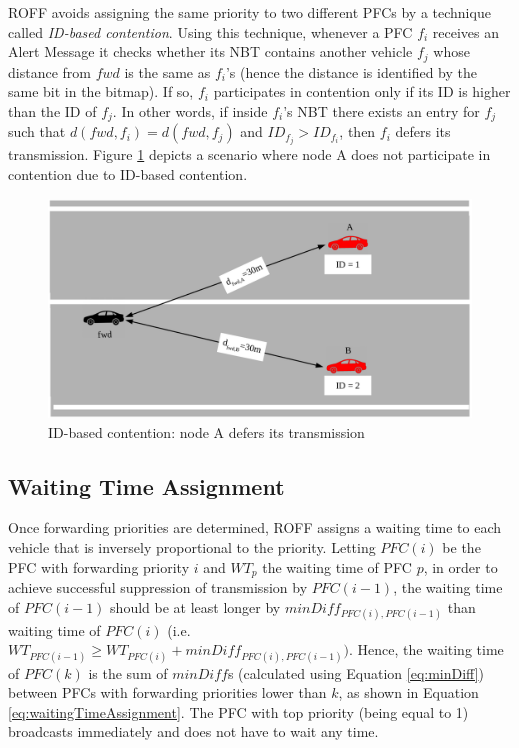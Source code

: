 			
			ROFF avoids assigning the same priority to two different PFCs by a technique called \textit{ID-based contention}. Using this technique, whenever a PFC $f_i$ receives an Alert Message it checks whether its NBT contains another vehicle $f_j$ whose distance from $fwd$ is the same as $f_i$'s (hence the distance is identified by the same bit in the bitmap). If so, $f_i$ participates in contention only if its ID is higher than the ID of $f_j$. In other words, if inside $f_i$'s NBT there exists an entry for $f_j$ such that $d(fwd, f_i) = d(fwd, f_j)$ and $ID_{f_j} > ID_{f_i}$, then $f_i$ defers its transmission. Figure \ref{fig:idBasedContention} depicts a scenario where node A does not participate in contention due to ID-based contention.
	
			\begin{figure}[H]
				\centering
				\includegraphics[width=\textwidth]{immagini/idBasedContention}
				\caption{ID-based contention: node A defers its transmission}
				\label{fig:idBasedContention}
			\end{figure}
		
		\subsection{Waiting Time Assignment}
			Once forwarding priorities are determined, ROFF assigns a waiting time to each vehicle that is inversely proportional to the priority. Letting $PFC(i)$ be the PFC with forwarding priority $i$ and $WT_p$ the waiting time of PFC $p$, in order to achieve successful suppression of transmission by $PFC(i-1)$, the waiting time of $PFC(i-1)$ should be at least longer by $minDiff_{PFC(i), PFC(i-1)}$ than waiting time of $PFC(i)$ (i.e. $WT_{PFC(i-1)} \geq WT_{PFC(i)} + minDiff_{PFC(i), PFC(i-1)})$. Hence, the waiting time of $PFC(k)$ is the sum of $minDiff$s (calculated using Equation \ref{eq:minDiff}) between PFCs with forwarding priorities lower than $k$, as shown in Equation \ref{eq:waitingTimeAssignment}. The PFC with top priority (being equal to 1) broadcasts immediately and does not have to wait any time.
			
